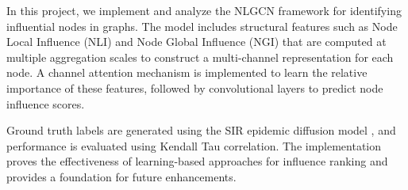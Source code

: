 \documentclass[12pt,a4wide]{report}
\theoremstyle{plain}
\theoremstyle{definition}
\theoremstyle{remark}
\begin{document}
In this project, we implement and analyze the NLGCN framework for 
identifying influential nodes in graphs. The model includes
structural features such as Node Local Influence (NLI) and Node 
Global Influence (NGI) that are computed at multiple aggregation scales to 
construct a multi-channel representation for each node. A channel attention mechanism is implemented to learn the 
relative importance of these features, followed by convolutional 
layers to predict node influence scores.

Ground truth labels are generated using the SIR epidemic diffusion 
model , and performance is evaluated using 
Kendall Tau correlation. The implementation 
proves the effectiveness of learning-based approaches for 
influence ranking and provides a foundation 
for future enhancements.

\clearpage
\tableofcontents
\clearpage
\listoffigures
\listoftables
\newpage
{}
\setcounter{page}{1}










\end{document}
